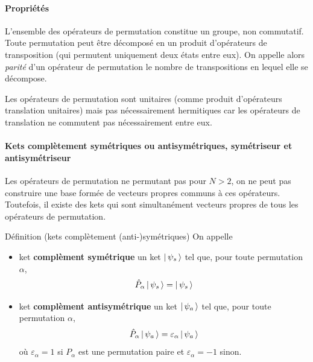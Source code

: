             \paragraph{Propriétés}

            L’ensemble des opérateurs de permutation constitue un groupe, non commutatif. Toute permutation peut être décomposé en un produit d’opérateurs de transposition (qui permutent uniquement deux états entre eux). On appelle alors \textit{parité} d’un opérateur de permutation le nombre de transpositions en lequel elle se décompose.

            Les opérateurs de permutation sont unitaires (comme produit d’opérateurs translation unitaires) mais pas nécessairement hermitiques car les opérateurs de translation ne commutent pas nécessairement entre eux.

            \paragraph{Kets complètement symétriques ou antisymétriques, symétriseur et antisymétriseur} 

            Les opérateurs de permutation ne permutant pas pour $N > 2$, on ne peut pas construire une base formée de vecteurs propres communs à ces opérateurs. Toutefois, il existe des kets qui sont simultanément vecteurs propres de tous les opérateurs de permutation. 

            \begin{omed}{Définition (kets complètement (anti-)symétriques)}
                On appelle
                \begin{itemize}
                    \item ket \textbf{complèment symétrique} un ket $\left| \, \psi_s \, \right>$ tel que, pour toute permutation $\alpha$,
                    \[ \hat{P}_{\alpha}\left| \, \psi_s \, \right> = \left| \, \psi_s \, \right> \]
                    \item ket \textbf{complèment antisymétrique} un ket $\left| \, \psi_a \, \right>$ tel que, pour toute permutation $\alpha$,
                    \[ \hat{P}_{\alpha}\left| \, \psi_a \, \right> = \varepsilon_{\alpha} \left| \, \psi_a \, \right> \]
                    où $\varepsilon_{\alpha} = 1$ si $P_{\alpha}$ est une permutation paire et $\varepsilon_{\alpha} = -1$ sinon.
                \end{itemize} 
            \end{omed}

